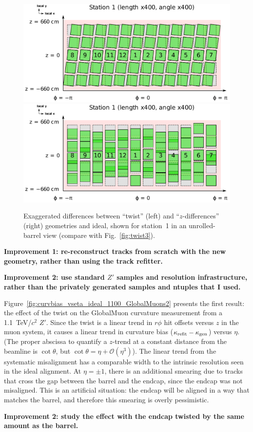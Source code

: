 \documentclass[12pt]{article}
\newcommand{\s}[1]{{\mbox{\scriptsize #1}}}
\begin{document}
\begin{figure}
\includegraphics[width=0.5\linewidth]{twist_station1.pdf}
\includegraphics[width=0.5\linewidth]{localy_station1.pdf}

\caption{Exaggerated differences between ``twist'' (left) and
  ``$z$-differences'' (right) geometries and ideal, shown for station~1 in
  an unrolled-barrel view (compare with
  Fig.~\ref{fig:twist3}). \label{fig:twist_station1}}
\end{figure}

{\bf Improvement 1: re-reconstruct tracks from scratch with the new
  geometry, rather than using the track refitter.}

{\bf Improvement 2: use standard $Z'$ samples and resolution
  infrastructure, rather than the privately generated samples and
  ntuples that I used.}

Figure~\ref{fig:curvbias_vseta_ideal_1100_GlobalMuons2} presents the
first result: the effect of the twist on the GlobalMuon curvature
measurement from a 1.1~TeV/$c^2$ $Z'$.  Since the twist is a linear
trend in $r\phi$ hit offsets versus $z$ in the muon system, it causes
a linear trend in curvature bias ($\kappa_\s{refit} - \kappa_\s{gen}$)
versus $\eta$.  (The proper abscissa to quantify a $z$-trend at a
constant distance from the beamline is $\cot\theta$, but $\cot\theta =
\eta + \mathcal{O}(\eta^3)$).  The linear trend from the systematic
misalignment has a comparable width to the intrinsic resolution seen
in the ideal alignment.  At $\eta=\pm 1$, there is an additional
smearing due to tracks that cross the gap between the barrel and the
endcap, since the endcap was not misaligned.  This is an artificial
situation: the endcap will be aligned in a way that matches the
barrel, and therefore this smearing is overly pessimistic.

{\bf Improvement 2: study the effect with the endcap twisted by the
  same amount as the barrel.}
\end{document}
